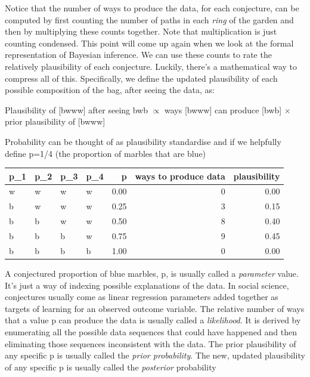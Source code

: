 \documentclass{article}
\begin{document}
Notice that the number of ways to produce the data, for each conjecture,
can be computed by first counting the number of paths in each
\emph{ring} of the garden and then by multiplying these counts together.
Note that multiplication is just counting condensed. This point will
come up again when we look at the formal representation of Bayesian
inference. We can use these counts to rate the relatively plausibility
of each conjecture. Luckily, there's a mathematical way to compress all
of this. Specifically, we define the updated plausibility of each
possible composition of the bag, after seeing the data, as:

Plausibility of {[}bwww{]} after seeing bwb \(\propto\) ways {[}bwww{]}
can produce {[}bwb{]} \(\times\) prior plausibility of {[}bwww{]}

Probability can be thought of as plausibility standardise and if we
helpfully define p=1/4 (the proportion of marbles that are blue)

\begin{table}
\centering
\begin{tabular}{l|l|l|l|r|r|r}
\hline
p\_1 & p\_2 & p\_3 & p\_4 & p & ways to produce data & plausibility\\
\hline
w & w & w & w & 0.00 & 0 & 0.00\\
\hline
b & w & w & w & 0.25 & 3 & 0.15\\
\hline
b & b & w & w & 0.50 & 8 & 0.40\\
\hline
b & b & b & w & 0.75 & 9 & 0.45\\
\hline
b & b & b & b & 1.00 & 0 & 0.00\\
\hline
\end{tabular}
\end{table}

A conjectured proportion of blue marbles, p, is usually called a
\emph{parameter} value. It's just a way of indexing possible
explanations of the data. In social science, conjectures usually come as
linear regression parameters added together as targets of learning for
an observed outcome variable. The relative number of ways that a value p
can produce the data is usually called a \emph{likelihood}. It is
derived by enumerating all the possible data sequences that could have
happened and then eliminating those sequences inconsistent with the
data. The prior plausibility of any specific p is usually called the
\emph{prior probability}. The new, updated plausibility of any specific
p is usually called the \emph{posterior} probability
\end{document}
